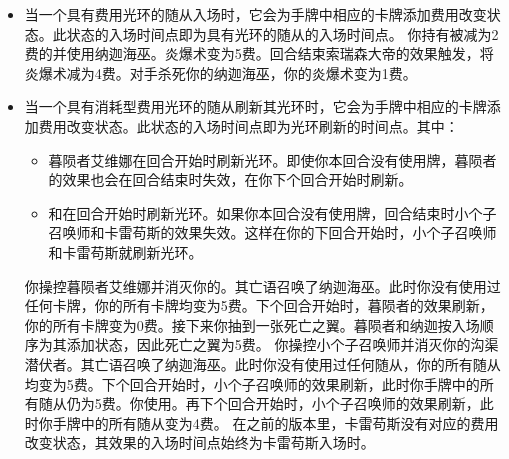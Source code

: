 \begin{itemize}
    \item 当一个具有费用光环的随从入场时，它会为手牌中相应的卡牌添加费用改变状态。此状态的入场时间点即为具有光环的随从的入场时间点。
        \example 你持有被减为2费的并使用纳迦海巫。炎爆术变为5费。回合结束索瑞森大帝的效果触发，将炎爆术减为4费。对手杀死你的纳迦海巫，你的炎爆术变为1费。
    \item 当一个具有消耗型费用光环的随从刷新其光环时，它会为手牌中相应的卡牌添加费用改变状态。此状态的入场时间点即为光环刷新的时间点。其中：
    \begin{itemize}
        \item 暮陨者艾维娜在回合开始时刷新光环。即使你本回合没有使用牌，暮陨者的效果也会在回合结束时失效，在你下个回合开始时刷新。
        \item {}和在回合开始时刷新光环。如果你本回合没有使用牌，回合结束时小个子召唤师和卡雷苟斯的效果失效。这样在你的下回合开始时，小个子召唤师和卡雷苟斯就刷新光环。
    \end{itemize}
        \example 你操控暮陨者艾维娜并消灭你的。其亡语召唤了纳迦海巫。此时你没有使用过任何卡牌，你的所有卡牌均变为5费。下个回合开始时，暮陨者的效果刷新，你的所有卡牌变为0费。接下来你抽到一张死亡之翼。暮陨者和纳迦按入场顺序为其添加状态，因此死亡之翼为5费。
        \example 你操控小个子召唤师并消灭你的沟渠潜伏者。其亡语召唤了纳迦海巫。此时你没有使用过任何随从，你的所有随从均变为5费。下个回合开始时，小个子召唤师的效果刷新，此时你手牌中的所有随从仍为5费。你使用。再下个回合开始时，小个子召唤师的效果刷新，此时你手牌中的所有随从变为4费。
        \notice {}在之前的版本里，卡雷苟斯没有对应的费用改变状态，其效果的入场时间点始终为卡雷苟斯入场时。


\end{itemize}
